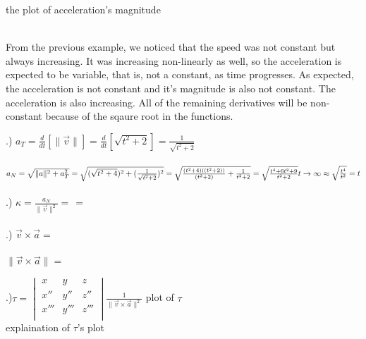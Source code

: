 \documentclass[12pt]{article}
\begin{document}
\noindent the plot of acceleration's magnitude\\\\

\noindent From the previous example, we noticed that the speed was not constant but always 
increasing. It was increasing non-linearly as well, so the acceleration is expected to be variable, that is, 
not a constant, as time progresses. As expected, the acceleration is not constant and it's magnitude is also 
not constant. The acceleration is also increasing. All of the remaining derivatives will be non-constant 
because of the sqaure root in the functions.


.) $a_{T} = \frac{d}{dt}[\| \vec{v} \|] = \frac{d}{dt}[\sqrt{t^{2} + 2}] = \frac{1}{\sqrt{t^{2} + 2}}$\\\\
\noindent $a_{N} = \sqrt{\| a \| ^{2} + a_{T}^{2}} 
\\= \sqrt{(\sqrt{t^{2} + 4})^{2} + (\frac{1}{\sqrt{t^{2} + 2}})^{2}}
\\= \sqrt{\frac{(t^{2} + 4)((t^{2} + 2))}{(t^{2} + 2)} + \frac{1}{t^{2} + 2}}
\\ = \sqrt{\frac{t^{4} + 6t^{2} + 9}{t^{2} + 2}}\\\\ t \to \infty \approx \sqrt{\frac{t^{4}}{t^{2}}} = t $\\\\
.) $\kappa = \frac{a_{N}}{\| \vec{v} \| ^{2}} = \frac{}{} = $\\\\
.)  $\vec{v} \times \vec{a} = $\\\\
\noindent $\| \vec{v} \times \vec{a} \| = $

.)$\tau = \begin{vmatrix}
      x    &  y   &z \\ 
      x''  &  y'' &z'' \\
      x''' &  y'''&z''' \\ 
\end{vmatrix}
\frac{1}{\| \vec{v} \times \vec{a}\|^{2}}$
\noindent plot of $\tau$\\
\noindent explaination of $\tau$'s plot
\end{document}
